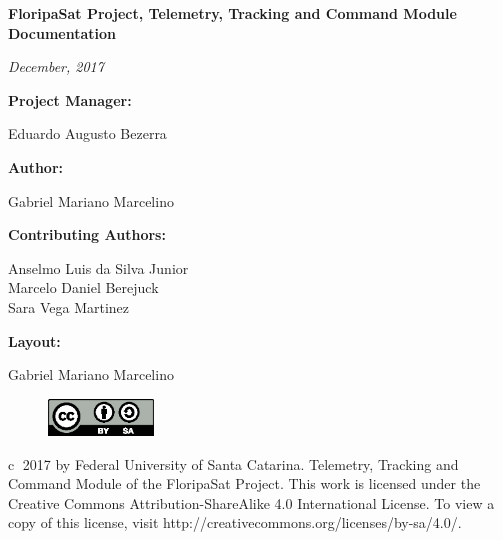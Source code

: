 \documentclass[12pt]{book}
\begin{document}
\thispagestyle{empty}

\begin{center}

\textbf{FloripaSat Project, Telemetry, Tracking and Command Module Documentation}

\textit{December, 2017}

\vspace{1cm}

\textbf{Project Manager:}

Eduardo Augusto Bezerra

\vspace{1cm}

\textbf{Author:}

Gabriel Mariano Marcelino

\vspace{1cm}

\textbf{Contributing Authors:}

Anselmo Luis da Silva Junior \\
Marcelo Daniel Berejuck \\
Sara Vega Martinez \\

\vspace{1cm}

\textbf{Layout:}

Gabriel Mariano Marcelino

\end{center}

\vspace{8cm}

\begin{figure}[!h]
	\begin{center}
		\includegraphics[width=0.25\textwidth]{figures/by-sa.eps}
	\end{center}
\end{figure}

\textcircled c 2017 by Federal University of Santa Catarina. Telemetry, Tracking and Command Module of the FloripaSat Project. This work is licensed under the Creative Commons Attribution-ShareAlike 4.0 International License. To view a copy of this license, visit http://creativecommons.org/licenses/by-sa/4.0/.
\end{document}
